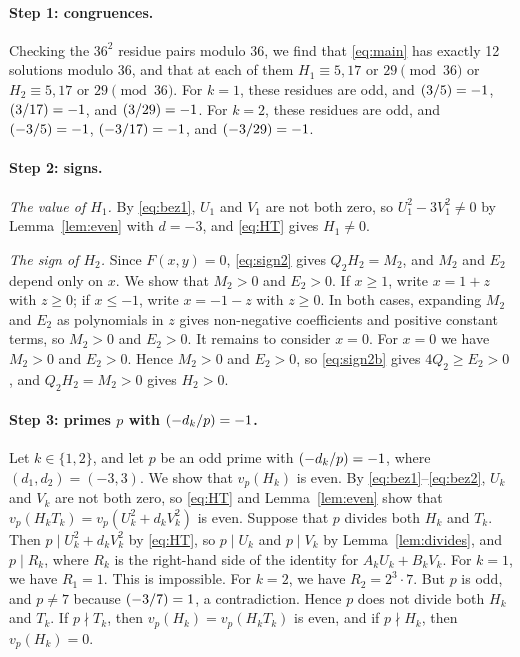 \documentclass[11pt]{article}
\newcommand{\leg}[2]{\mathchoice{\biggl(\dfrac{#1}{#2}\biggr)}{(#1/#2)}{(#1/#2)}{(#1/#2)}}
\begin{document}
\paragraph{Step 1: congruences.} Checking the $36^2$ residue pairs modulo $36$, we find that \eqref{eq:main} has exactly 12 solutions modulo $36$, and that at each of them $H_{1}\equiv5,\allowbreak 17\text{ or }29\pmod{36}$ or $H_{2}\equiv5,\allowbreak 17\text{ or }29\pmod{36}$. For $k=1$, these residues are odd, and $\leg{3}{5}=-1$, $\leg{3}{17}=-1$, and $\leg{3}{29}=-1$. For $k=2$, these residues are odd, and $\leg{-3}{5}=-1$, $\leg{-3}{17}=-1$, and $\leg{-3}{29}=-1$.

\paragraph{Step 2: signs.} \emph{The value of $H_{1}$.} By \eqref{eq:bez1}, $U_{1}$ and $V_{1}$ are not both zero, so $U_{1}^2-3V_{1}^2\neq0$ by Lemma~\ref{lem:even} with $d=-3$, and \eqref{eq:HT} gives $H_{1}\neq0$.

\emph{The sign of $H_{2}$.} Since $F(x,y)=0$, \eqref{eq:sign2} gives $Q_{2}H_{2}=M_{2}$, and $M_{2}$ and $E_{2}$ depend only on $x$. We show that $M_{2}>0$ and $E_{2}>0$. If $x\geq1$, write $x=1+z$ with $z\geq0$; if $x\leq-1$, write $x=-1-z$ with $z\geq0$. In both cases, expanding $M_{2}$ and $E_{2}$ as polynomials in $z$ gives non-negative coefficients and positive constant terms, so $M_{2}>0$ and $E_{2}>0$. It remains to consider $x=0$. For $x=0$ we have $M_{2}>0$ and $E_{2}>0$. Hence $M_{2}>0$ and $E_{2}>0$, so \eqref{eq:sign2b} gives $4Q_{2}\geq E_{2}>0$, and $Q_{2}H_{2}=M_{2}>0$ gives $H_{2}>0$.

\paragraph{Step 3: primes $p$ with $\leg{-d_k}{p}=-1$.} Let $k\in\{1,2\}$, and let $p$ be an odd prime with $\leg{-d_k}{p}=-1$, where $(d_{1},d_{2})=(-3,3)$. We show that $v_p(H_k)$ is even. By \eqref{eq:bez1}--\eqref{eq:bez2}, $U_k$ and $V_k$ are not both zero, so \eqref{eq:HT} and Lemma~\ref{lem:even} show that $v_p(H_kT_k)=v_p(U_k^2+d_kV_k^2)$ is even. Suppose that $p$ divides both $H_k$ and $T_k$. Then $p\mid U_k^2+d_kV_k^2$ by \eqref{eq:HT}, so $p\mid U_k$ and $p\mid V_k$ by Lemma~\ref{lem:divides}, and $p\mid R_k$, where $R_k$ is the right-hand side of the identity for $A_kU_k+B_kV_k$. For $k=1$, we have $R_{1}=1$. This is impossible. For $k=2$, we have $R_{2}=2^{3}\cdot 7$. But $p$ is odd, and $p\neq7$ because $\leg{-3}{7}=1$, a contradiction. Hence $p$ does not divide both $H_k$ and $T_k$. If $p\nmid T_k$, then $v_p(H_k)=v_p(H_kT_k)$ is even, and if $p\nmid H_k$, then $v_p(H_k)=0$.
\end{document}
